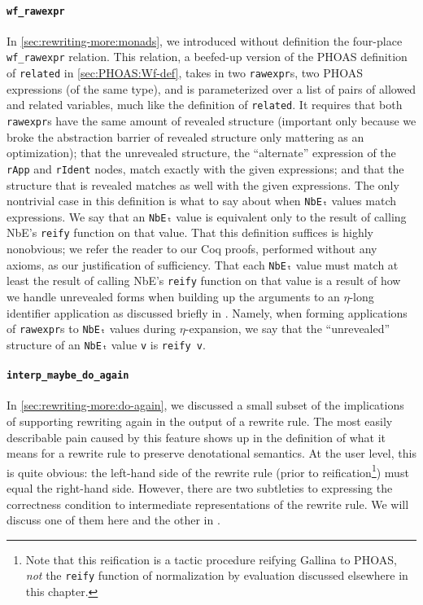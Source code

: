 \paragraph{\texorpdfstring{\texttt{wf_rawexpr}}{wf\_rawexpr}}
In \autoref{sec:rewriting-more:monads}, we introduced without definition the four-place \texttt{wf_rawexpr} relation.
This relation, a beefed-up version of the PHOAS definition of \texttt{related} in \autoref{sec:PHOAS:Wf-def}, takes in two \texttt{rawexpr}s, two PHOAS expressions (of the same type), and is parameterized over a list of pairs of allowed and related variables, much like the definition of \texttt{related}.
It requires that both \texttt{rawexpr}s have the same amount of revealed structure (important only because we broke the abstraction barrier of revealed structure only mattering as an optimization); that the unrevealed structure, the ``alternate'' expression of the \texttt{rApp} and \texttt{rIdent} nodes, match exactly with the given expressions; and that the structure that is revealed matches as well with the given expressions.
The only nontrivial case in this definition is what to say about when \texttt{NbEₜ} values match expressions.
We say that an \texttt{NbEₜ} value is equivalent only to the result of calling NbE's \texttt{reify} function on that value.
That this definition suffices is highly nonobvious; we refer the reader to our Coq proofs, performed without any axioms, as our justification of sufficiency.
That each \texttt{NbEₜ} value must match at least the result of calling NbE's \texttt{reify} function on that value is a result of how we handle unrevealed forms when building up the arguments to an $\eta$-long identifier application as discussed briefly in .
Namely, when forming applications of \texttt{rawexpr}s to \texttt{NbEₜ} values during $\eta$-expansion, we say that the ``unrevealed'' structure of an \texttt{NbEₜ} value \texttt{v} is \texttt{reify v}.

\paragraph{\texorpdfstring{\texttt{interp_maybe_do_again}}{interp\_maybe\_do\_again}}
In \autoref{sec:rewriting-more:do-again}, we discussed a small subset of the implications of supporting rewriting again in the output of a rewrite rule.
The most easily describable pain caused by this feature shows up in the definition of what it means for a rewrite rule to preserve denotational semantics.
At the user level, this is quite obvious: the left-hand side of the rewrite rule (prior to reification\footnote{%
  Note that this reification is a tactic procedure reifying Gallina to PHOAS, \emph{not} the \texttt{reify} function of normalization by evaluation discussed elsewhere in this chapter.%
}) must equal the right-hand side.
However, there are two subtleties to expressing the correctness condition to intermediate representations of the rewrite rule.
We will discuss one of them here and the other in .

